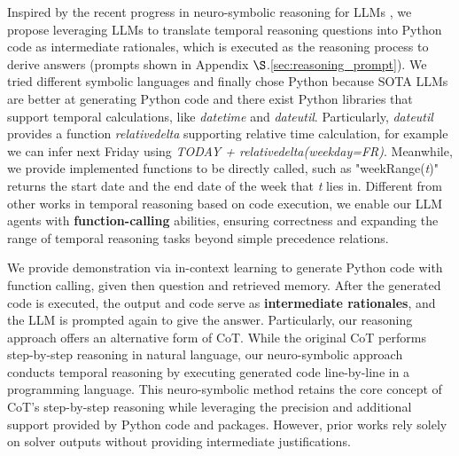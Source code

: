 
Inspired by the recent progress in neuro-symbolic reasoning for LLMs \cite{han2022folio, pan2023logic}, we propose leveraging LLMs to translate temporal reasoning questions into Python code as intermediate rationales, which is executed as the reasoning process to derive answers (prompts shown in Appendix $\S$.\ref{sec:reasoning_prompt}). We tried different symbolic languages and finally chose Python because SOTA LLMs are better at generating Python code and there exist Python libraries that support temporal calculations, like \textit{datetime} and \textit{dateutil}. Particularly, \textit{dateutil} provides a function \textit{relativedelta} supporting relative time calculation, for example we can infer next Friday using \textit{TODAY + relativedelta(weekday=FR)}. Meanwhile, we provide implemented functions to be directly called, such as "weekRange(\textit{t})" returns the start date and the end date of the week that \textit{t} lies in.  Different from other works in temporal reasoning based on code execution\cite{li2023unlocking}, we enable our LLM agents with \textbf{function-calling} abilities, ensuring correctness and expanding the range of temporal reasoning tasks beyond simple precedence relations.

We provide demonstration via in-context learning to generate Python code with function calling, given then question and retrieved memory. After the generated code is executed, the output and code serve as \textbf{intermediate rationales}, and the LLM is prompted again to give the answer. Particularly, our reasoning approach offers an alternative form of CoT. While the original CoT \cite{wei2022chain} performs step-by-step reasoning in natural language, our neuro-symbolic approach conducts temporal reasoning by executing generated code line-by-line in a programming language. This neuro-symbolic method retains the core concept of CoT’s step-by-step reasoning while leveraging the precision and additional support provided by Python code and packages. However, prior works \cite{li2023unlocking} rely solely on solver outputs without providing intermediate justifications.